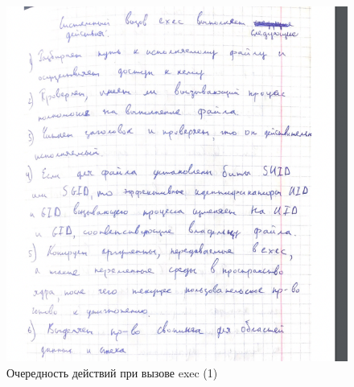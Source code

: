 \documentclass[12pt]{report}
\begin{document}
\begin{figure}[H]

	\centering

	\includegraphics[width=\linewidth]{img/exec_1.png}
	\caption{Очередность действий при вызове exec (1)}

\end{figure}
\end{document}

